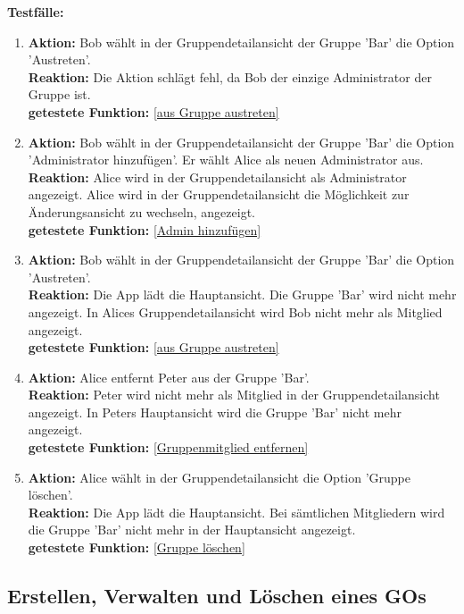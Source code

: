 \documentclass[parskip=full]{scrartcl}
\def\threedigits#1{%
  \ifnum#1<100 0\fi
  \ifnum#1<10 0\fi
  \number#1}
\begin{document}
\textbf{Testfälle:}
\begin{enumerate}[label={\textbf{/T\protect\threedigits{\theenumi}0/}}, leftmargin=*, resume]
	\item \textbf{Aktion:} Bob wählt in der Gruppendetailansicht der Gruppe 'Bar' die Option 'Austreten'. \\
	\textbf{Reaktion:} Die Aktion schlägt fehl, da Bob der einzige Administrator der Gruppe ist.\\
	\textbf{getestete Funktion:} \ref{aus Gruppe austreten}
	\item \textbf{Aktion:} Bob wählt in der Gruppendetailansicht der Gruppe 'Bar' die Option 'Administrator hinzufügen'. Er wählt Alice als neuen Administrator aus.\\
	\textbf{Reaktion:} Alice wird in der Gruppendetailansicht als Administrator angezeigt. Alice wird in der Gruppendetailansicht die Möglichkeit zur Änderungsansicht zu wechseln, angezeigt.\\
	\textbf{getestete Funktion:} \ref{Admin hinzufügen}
	\item \textbf{Aktion:} Bob wählt in der Gruppendetailansicht der Gruppe 'Bar' die Option 'Austreten'.\\
	\textbf{Reaktion:} Die App lädt die Hauptansicht. Die Gruppe 'Bar' wird nicht mehr angezeigt. In Alices Gruppendetailansicht wird Bob nicht mehr als Mitglied angezeigt.\\
	\textbf{getestete Funktion:} \ref{aus Gruppe austreten}
	\item \textbf{Aktion:} Alice entfernt Peter aus der Gruppe 'Bar'.\\
	\textbf{Reaktion:} Peter wird nicht mehr als Mitglied in der Gruppendetailansicht angezeigt. In Peters Hauptansicht wird die Gruppe 'Bar' nicht mehr angezeigt.\\
	\textbf{getestete Funktion:} \ref{Gruppenmitglied entfernen}
	\item \textbf{Aktion:} Alice wählt in der Gruppendetailansicht die Option 'Gruppe löschen'.\\
	\textbf{Reaktion:} Die App lädt die Hauptansicht. Bei sämtlichen Mitgliedern wird die Gruppe 'Bar' nicht mehr in der Hauptansicht angezeigt.\\
	\textbf{getestete Funktion:} \ref{Gruppe löschen}
\end{enumerate}

\subsection{Erstellen, Verwalten und Löschen eines GOs}
\end{document}
